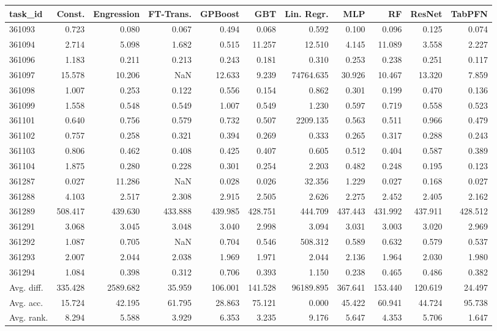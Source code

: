 \begin{tabular}{lrrrrrrrrrr}
\toprule
task\_id & Const. & Engression & FT-Trans. & GPBoost & GBT & Lin. Regr. & MLP & RF & ResNet & TabPFN \\
\midrule
361093 & 0.723 & 0.080 & 0.067 & 0.494 & 0.068 & 0.592 & 0.100 & 0.096 & 0.125 & 0.074 \\
361094 & 2.714 & 5.098 & 1.682 & 0.515 & 11.257 & 12.510 & 4.145 & 11.089 & 3.558 & 2.227 \\
361096 & 1.183 & 0.211 & 0.213 & 0.243 & 0.181 & 0.310 & 0.253 & 0.238 & 0.251 & 0.117 \\
361097 & 15.578 & 10.206 & NaN & 12.633 & 9.239 & 74764.635 & 30.926 & 10.467 & 13.320 & 7.859 \\
361098 & 1.007 & 0.253 & 0.122 & 0.556 & 0.154 & 0.862 & 0.301 & 0.199 & 0.470 & 0.136 \\
361099 & 1.558 & 0.548 & 0.549 & 1.007 & 0.549 & 1.230 & 0.597 & 0.719 & 0.558 & 0.523 \\
361101 & 0.640 & 0.756 & 0.579 & 0.732 & 0.507 & 2209.135 & 0.563 & 0.511 & 0.966 & 0.479 \\
361102 & 0.757 & 0.258 & 0.321 & 0.394 & 0.269 & 0.333 & 0.265 & 0.317 & 0.288 & 0.243 \\
361103 & 0.806 & 0.462 & 0.408 & 0.425 & 0.407 & 0.605 & 0.512 & 0.404 & 0.587 & 0.389 \\
361104 & 1.875 & 0.280 & 0.228 & 0.301 & 0.254 & 2.203 & 0.482 & 0.248 & 0.195 & 0.123 \\
361287 & 0.027 & 11.286 & NaN & 0.028 & 0.026 & 32.356 & 1.229 & 0.027 & 0.168 & 0.027 \\
361288 & 4.103 & 2.517 & 2.308 & 2.915 & 2.505 & 2.626 & 2.275 & 2.452 & 2.405 & 2.162 \\
361289 & 508.417 & 439.630 & 433.888 & 439.985 & 428.751 & 444.709 & 437.443 & 431.992 & 437.911 & 428.512 \\
361291 & 3.068 & 3.045 & 3.048 & 3.040 & 2.998 & 3.094 & 3.031 & 3.003 & 3.020 & 2.969 \\
361292 & 1.087 & 0.705 & NaN & 0.704 & 0.546 & 508.312 & 0.589 & 0.632 & 0.579 & 0.537 \\
361293 & 2.007 & 2.044 & 2.038 & 1.969 & 1.971 & 2.044 & 2.136 & 1.964 & 2.030 & 1.980 \\
361294 & 1.084 & 0.398 & 0.312 & 0.706 & 0.393 & 1.150 & 0.238 & 0.465 & 0.486 & 0.382 \\
Avg. diff. & 335.428 & 2589.682 & 35.959 & 106.001 & 141.528 & 96189.895 & 367.641 & 153.440 & 120.619 & 24.497 \\
Avg. acc. & 15.724 & 42.195 & 61.795 & 28.863 & 75.121 & 0.000 & 45.422 & 60.941 & 44.724 & 95.738 \\
Avg. rank. & 8.294 & 5.588 & 3.929 & 6.353 & 3.235 & 9.176 & 5.647 & 4.353 & 5.706 & 1.647 \\
\bottomrule
\end{tabular}
